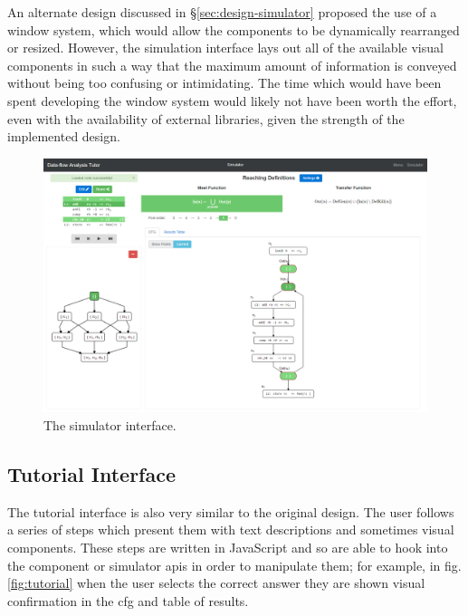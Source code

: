 \documentclass[bsc,twoside,singlespacing,parskip,logo,notimes,normalheadings]{infthesis}
\begin{document}
        An alternate design discussed in \S\ref{sec:design-simulator}
        proposed the use of a window system, which would allow the
        components to be dynamically rearranged or resized. However,
        the simulation interface lays out all of the available visual
        components in such a way that the maximum amount of
        information is conveyed without being too confusing or
        intimidating. The time which would have been spent developing
        the window system would likely not have been worth the effort,
        even with the availability of external libraries, given the
        strength of the implemented design.

        \begin{figure}[p]
          \centering
          \includegraphics[width=\textheight, angle=-90]{img/simulator.png}
          \captionsetup{width=\textwidth, justification=centering}
          \caption{The simulator interface.}\label{fig:simulator}
        \end{figure}

        \subsection{Tutorial Interface}
        
        The tutorial interface is also very similar to the original
        design. The user follows a series of steps which present them
        with text descriptions and sometimes visual components. These
        steps are written in JavaScript and so are able to hook into
        the component or simulator \gls{api}s in order to manipulate
        them; for example, in fig. \ref{fig:tutorial} when the user
        selects the correct answer they are shown visual confirmation
        in the \gls{cfg} and table of results.
\end{document}
